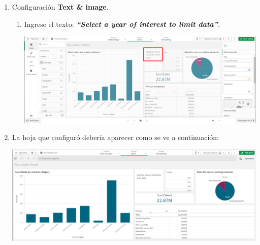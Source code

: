 \documentclass[12pt,letterpaper]{article}
\newcommand\tab[1][1cm]{\hspace*{#1}}
\begin{document}
\begin{enumerate}[\tab 1.]
\begin{enumerate}
\begin{center}
            \end{center}
        \end{enumerate}
        \item Configuración \textbf{Text \& image}.
        \begin{enumerate}
            \item Ingrese el texto: \textit{\textbf{“Select a year of interest to limit data”}}.
            \begin{center}
                \includegraphics[width=13cm]{./img/img35.png}
            \end{center}
        \end{enumerate}
        \item La hoja que configuró debería aparecer como se ve a continuación:
        \begin{center}
            \includegraphics[width=13cm]{./img/img36.png}
        \end{center}
    \end{enumerate}
    
\end{document}
